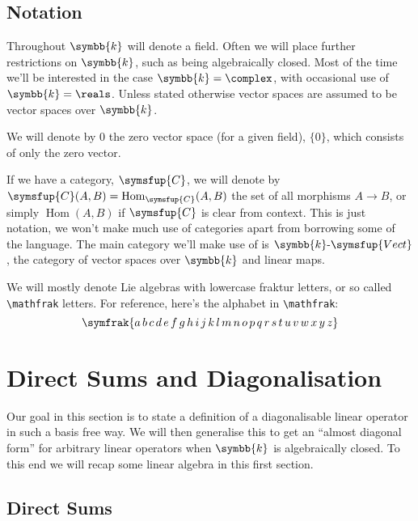 \documentclass[fleqn]{NotesClass}
\makeatletter
\renewcommand{\field}{\symbb{k}}
\newcommand{\cat}[1]{\symsfup{#1}}
\newcommand{\c@egory}[1]{\symsfup{#1}}
\newcommand{\Vect}[1][\field]{#1\text{-}\c@egory{Vect}}
\DeclareMathOperator{\Hom}{Hom}
\makeatother
\begin{document}
	\section{Notation}
	Throughout \(\field\) will denote a field.
	Often we will place further restrictions on \(\field\), such as being algebraically closed.
	Most of the time we'll be interested in the case \(\field = \complex\), with occasional use of \(\field = \reals\).
	Unless stated otherwise vector spaces are assumed to be vector spaces over \(\field\).
    
    We will denote by \(0\) the zero vector space (for a given field), \(\{0\}\), which consists of only the zero vector.
	
	If we have a category, \(\cat{C}\), we will denote by \(\cat{C}(A, B) = \Hom_{\cat{C}}(A, B)\) the set of all morphisms \(A \to B\), or simply \(\Hom(A, B)\) if \(\cat{C}\) is clear from context.
	This is just notation, we won't make much use of categories apart from borrowing some of the language.
	The main category we'll make use of is \(\Vect\), the category of vector spaces over \(\field\) and linear maps.
    
    We will mostly denote Lie algebras with lowercase fraktur letters, or so called \verb*|\mathfrak| letters.
    For reference, here's the alphabet in \verb*|\mathfrak|:
    \begin{equation*}
        \symfrak{a\,b\,c\,d\,e\,f\,g\,h\,i\,j\,k\,l\,m\,n\,o\,p\,q\,r\,s\,t\,u\,v\,w\,x\,y\,z}
    \end{equation*}
	
	\chapter{Direct Sums and Diagonalisation}
	Our goal in this section is to state a definition of a diagonalisable linear operator in such a basis free way.
	We will then generalise this to get an \enquote{almost diagonal form} for arbitrary linear operators when \(\field\) is algebraically closed.
	To this end we will recap some linear algebra in this first section.
	
	\section{Direct Sums}
\end{document}
